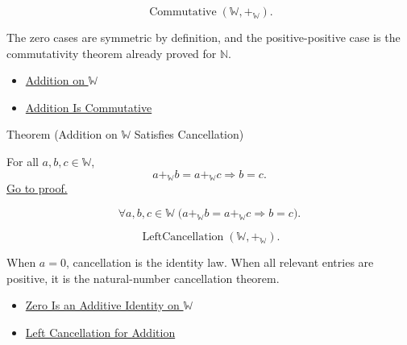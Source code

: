 \begin{remark*}
\[
\operatorname{Commutative}(\mathbb{W},+_{\mathbb{W}}).
\]
\end{remark*}

\begin{remark*}[Interpretation]
The zero cases are symmetric by definition, and the positive-positive case is
the commutativity theorem already proved for $\mathbb{N}$.
\end{remark*}

\begin{dependencies}
\begin{itemize}
  \item \hyperref[def:addition-on-w]{Addition on $\mathbb{W}$}
  \item \hyperref[thm:addition-commutative]{Addition Is Commutative}
\end{itemize}
\end{dependencies}

\begin{theorembox}{Theorem (Addition on \texorpdfstring{$\mathbb{W}$}{W} Satisfies Cancellation)}
\begin{theorem}
\label{thm:addition-on-w-cancellation}
For all $a,b,c\in\mathbb{W}$,
\[
a+_{\mathbb{W}}b=a+_{\mathbb{W}}c\Longrightarrow b=c.
\]
\hyperref[prf:addition-on-w-cancellation]{Go to proof.}
\end{theorem}
\end{theorembox}

\begin{remark*}
\[
\forall a,b,c\in\mathbb{W}\;
\bigl(a+_{\mathbb{W}}b=a+_{\mathbb{W}}c\Longrightarrow b=c\bigr).
\]
\end{remark*}

\begin{remark*}
\[
\operatorname{LeftCancellation}(\mathbb{W},+_{\mathbb{W}}).
\]
\end{remark*}

\begin{remark*}[Interpretation]
When $a=0$, cancellation is the identity law. When all relevant entries are
positive, it is the natural-number cancellation theorem.
\end{remark*}

\begin{dependencies}
\begin{itemize}
  \item \hyperref[thm:zero-additive-identity-on-w]{Zero Is an Additive Identity on $\mathbb{W}$}
  \item \hyperref[thm:addition-left-cancellation]{Left Cancellation for Addition}
\end{itemize}
\end{dependencies}
